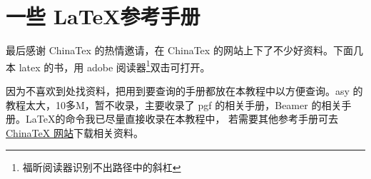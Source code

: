 \chapter{一些 \LaTeX 参考手册}
\thispagestyle{fancy}   

最后感谢 ChinaTex 的热情邀请，在 ChinaTex 的网站上下了不少好资料。下面几本 latex 的书，用 adobe 阅读器\textcolor[rgb]{1.00,0.00,0.00}{\footnote{\textcolor[rgb]{1.00,0.00,0.00}{福昕阅读器识别不出路径中的斜杠}}}双击可打开。

因为不喜欢到处找资料，把用到要查询的手册都放在本教程中以方便查询。asy 的教程太大，10多M，暂不收录，主要收录了 pgf 的相关手册，Beamer 的相关手册。\LaTeX 的命令我已尽量直接收录在本教程中，
若需要其他参考手册可去\href{http://www.chinatex.org}{\textcolor[rgb]{0.00,0.50,0.00}{ChinaTeX 网站}}下载相关资料。


